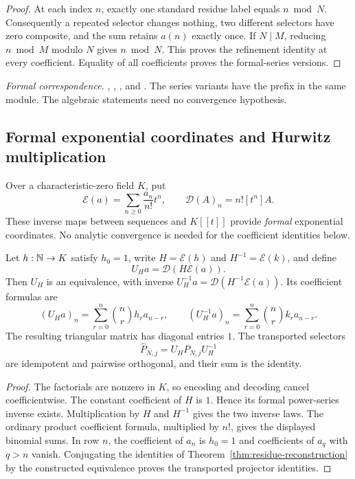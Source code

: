 \begin{proof}
At each index $n$, exactly one standard residue label equals $n\bmod N$.
Consequently a repeated selector changes nothing, two different selectors have
zero composite, and the sum retains $a(n)$ exactly once. If $N\mid M$, reducing
$n\bmod M$ modulo $N$ gives $n\bmod N$. This proves the refinement identity
at every coefficient. Equality of all coefficients proves the formal-series
versions.
\end{proof}

\begingroup\small\raggedright
\noindent\emph{Formal correspondence.}
,
,
, and
. The series variants have the
prefix  in the same module.
The algebraic statements need no convergence hypothesis.
\par\endgroup

\subsection{Formal exponential coordinates and Hurwitz multiplication}

Over a characteristic-zero field $K$, put
\[
\mathcal E(a)=\sum_{n\geq0}\frac{a_n}{n!}t^n,
\qquad \mathcal D(A)_n=n![t^n]A.
\]
These inverse maps between sequences and $K[[t]]$ provide \emph{formal}
exponential coordinates. No analytic convergence is needed for the coefficient
identities below.

\begin{theorem}
\label{thm:egf-coordinates}
Let $h:\mathbb N\to K$ satisfy $h_0=1$, write $H=\mathcal E(h)$ and
$H^{-1}=\mathcal E(k)$, and define
\[
U_Ha=\mathcal D(H\mathcal E(a)).
\]
Then $U_H$ is an equivalence, with inverse
$U_H^{-1}a=\mathcal D(H^{-1}\mathcal E(a))$. Its coefficient formulas are
\[
(U_Ha)_n=\sum_{r=0}^{n}\binom nr h_r a_{n-r},\qquad
(U_H^{-1}a)_n=\sum_{r=0}^{n}\binom nr k_r a_{n-r}.
\]
The resulting triangular matrix has diagonal entries $1$. The transported
selectors
\[
\widehat P_{N,j}=U_HP_{N,j}U_H^{-1}
\]
are idempotent and pairwise orthogonal, and their sum is the identity.
\end{theorem}

\begin{proof}
The factorials are nonzero in $K$, so encoding and decoding cancel
coefficientwise. The constant coefficient of $H$ is $1$. Hence its formal
power-series inverse exists. Multiplication by $H$ and $H^{-1}$ gives the two
inverse laws. The ordinary product coefficient formula, multiplied by $n!$,
gives the displayed binomial sums. In row $n$, the coefficient of $a_n$ is
$h_0=1$ and coefficients of $a_q$ with $q>n$ vanish. Conjugating the identities
of Theorem~\ref{thm:residue-reconstruction} by the constructed equivalence proves
the transported projector identities.
\end{proof}

